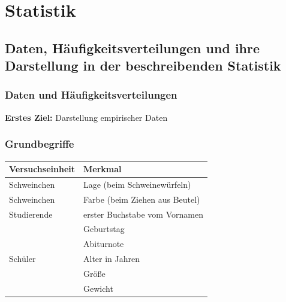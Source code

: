 

\chapter{Statistik}\label{ch:statistik}


\section{Daten, Häufigkeitsverteilungen und ihre Darstellung in der beschreibenden Statistik}\label{sec:daten-haufigkeitsverteilungen-und-ihre-darstellung-in-der-beschreibenden-statistik}

\subsection{Daten und Häufigkeitsverteilungen}\label{subsec:daten-und-haufigkeitsverteilungen}


\noindent \textbf{Erstes Ziel:} Darstellung empirischer Daten

\subsection*{Grundbegriffe}


\begin{bsp}
    \begin{mytable}
        \begin{tabular}{ll}
            \hline
            \textbf{Versuchseinheit} & \textbf{Merkmal}               \\
            \hline
            Schweinchen              & Lage (beim Schweinewürfeln)    \\
            Schweinchen              & Farbe (beim Ziehen aus Beutel) \\
            Studierende              & erster Buchstabe vom Vornamen  \\
            & Geburtstag                     \\
            & Abiturnote                     \\
            Schüler                  & Alter in Jahren                \\
            & Größe                          \\
            & Gewicht                        \\
            \hline
        \end{tabular}
    \end{mytable}
\end{bsp}

